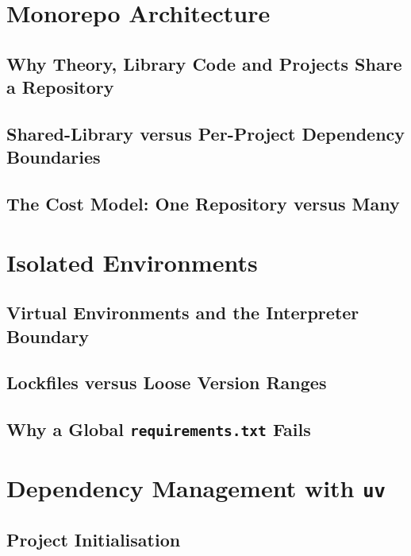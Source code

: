 \section{Monorepo Architecture}
\label{sec:monorepo}

\subsection{Why Theory, Library Code and Projects Share a Repository}

\subsection{Shared-Library versus Per-Project Dependency Boundaries}

\subsection{The Cost Model: One Repository versus Many}

\section{Isolated Environments}
\label{sec:isolated-environments}

\subsection{Virtual Environments and the Interpreter Boundary}

\subsection{Lockfiles versus Loose Version Ranges}

\subsection{Why a Global \texttt{requirements.txt} Fails}

\section{Dependency Management with \texttt{uv}}
\label{sec:uv}

\subsection{Project Initialisation}

